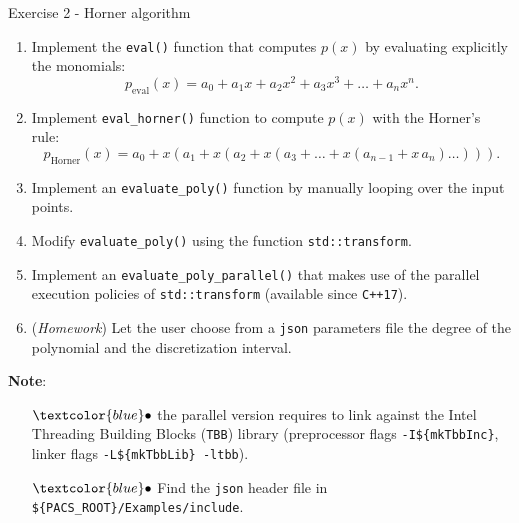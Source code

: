 \documentclass[10pt,aspectratio=169]{beamer}
\begin{document}
\begin{frame}{Exercise 2 - Horner algorithm}
		
	\begin{enumerate}
		\item Implement the \texttt{eval()} function that computes $p(x)$ by evaluating explicitly the monomials: 
		\begin{equation*}
		p_\text{eval}(x) = a_0 + a_1x + a_2x^2 + a_3x^3 + \ldots + a_nx^n.
		\end{equation*}
		\item Implement \texttt{eval\_horner()} function to compute $p(x)$ with the Horner's rule:
		\begin{equation*}
			p_\text{Horner}(x) = a_0 + x \left(a_1 + x \left(a_2 + x \left(a_3 + \ldots + x\left(a_{n-1} + x \, a_n\right) \ldots \right) \right) \right).
		\end{equation*}
		\item Implement an \texttt{evaluate\_poly()} function by manually looping over the input points.
		\item Modify \texttt{evaluate\_poly()} using the function \texttt{std::transform}.
		\item Implement an \texttt{evaluate\_poly\_parallel()} that makes use of the parallel execution policies of \texttt{std::transform} (available since \texttt{C++17}).
		\item (\textit{Homework}) Let the user choose from a \texttt{json} parameters file the degree of the polynomial and the discretization interval.
	\end{enumerate}
	
	\textbf{Note}: 
	\begin{itemize}
	\item[$\textcolor{blue}\bullet$] the parallel version requires to link against the Intel Threading Building Blocks (\texttt{TBB}) library (preprocessor flags \texttt{-I\$\{mkTbbInc\}}, linker flags \texttt{-L\$\{mkTbbLib\} -ltbb}). \\
	\item[$\textcolor{blue}\bullet$] Find the \texttt{json} header file in \texttt{\$\{PACS\_ROOT\}/Examples/include}.
\end{itemize}
\end{frame}
\end{document}
